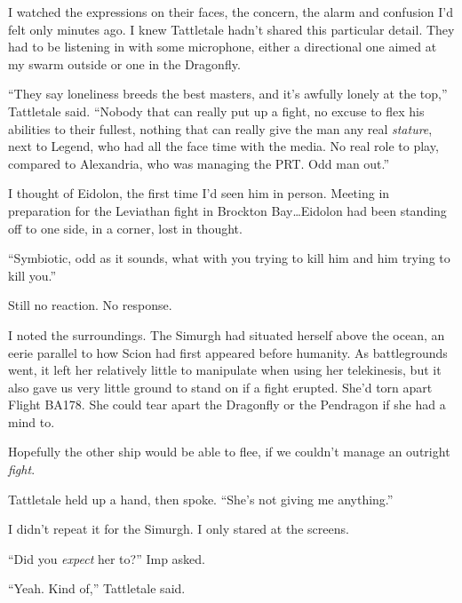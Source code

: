 I watched the expressions on their faces, the concern, the alarm and confusion I'd felt only minutes ago.  I knew Tattletale hadn't shared this particular detail.  They had to be listening in with some microphone, either a directional one aimed at my swarm outside or one in the Dragonfly.



``They say loneliness breeds the best masters, and it's awfully lonely at the top,'' Tattletale said.  ``Nobody that can really put up a fight, no excuse to flex his abilities to their fullest, nothing that can really give the man any real \emph{stature}, next to Legend, who had all the face time with the media.  No real role to play, compared to Alexandria, who was managing the PRT.  Odd man out.''



I thought of Eidolon, the first time I'd seen him in person.  Meeting in preparation for the Leviathan fight in Brockton Bay\ldots Eidolon had been standing off to one side, in a corner, lost in thought.



``Symbiotic, odd as it sounds, what with you trying to kill him and him trying to kill you.''



Still no reaction.  No response.



I noted the surroundings.  The Simurgh had situated herself above the ocean, an eerie parallel to how Scion had first appeared before humanity.  As battlegrounds went, it left her relatively little to manipulate when using her telekinesis, but it also gave us very little ground to stand on if a fight erupted.  She'd torn apart Flight BA178.  She could tear apart the Dragonfly or the Pendragon if she had a mind to.



Hopefully the other ship would be able to flee, if we couldn't manage an outright \emph{fight}.



Tattletale held up a hand, then spoke.  ``She's not giving me anything.''



I didn't repeat it for the Simurgh.  I only stared at the screens.



``Did you \emph{expect} her to?''  Imp asked.



``Yeah.  Kind of,'' Tattletale said.



